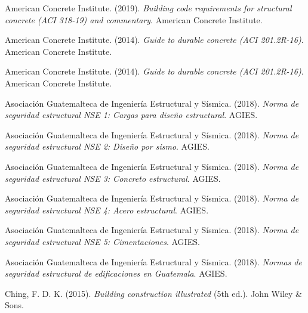 \documentclass[14pt,letterpaper]{extarticle}
\begin{document}
	
	\renewcommand{\refname}{Referencias}
	
		 American Concrete Institute. (2019). \textit{Building code requirements for structural concrete (ACI 318-19) and commentary}. American Concrete Institute.
		
	
		 American Concrete Institute. (2014). \textit{Guide to durable concrete (ACI 201.2R-16)}. American Concrete Institute.
	

		
	
		
		American Concrete Institute. (2014). \textit{Guide to durable concrete (ACI 201.2R-16)}. American Concrete Institute.
		
		Asociación Guatemalteca de Ingeniería Estructural y Sísmica. (2018). \textit{Norma de seguridad estructural NSE 1: Cargas para diseño estructural}. AGIES.
		
		 Asociación Guatemalteca de Ingeniería Estructural y Sísmica. (2018). \textit{Norma de seguridad estructural NSE 2: Diseño por sismo}. AGIES.
		
		 Asociación Guatemalteca de Ingeniería Estructural y Sísmica. (2018). \textit{Norma de seguridad estructural NSE 3: Concreto estructural}. AGIES.
		
		 Asociación Guatemalteca de Ingeniería Estructural y Sísmica. (2018). \textit{Norma de seguridad estructural NSE 4: Acero estructural}. AGIES.
		
		 Asociación Guatemalteca de Ingeniería Estructural y Sísmica. (2018). \textit{Norma de seguridad estructural NSE 5: Cimentaciones}. AGIES.
		
		 Asociación Guatemalteca de Ingeniería Estructural y Sísmica. (2018). \textit{Normas de seguridad estructural de edificaciones en Guatemala}. AGIES.
		
		Ching, F. D. K. (2015). \textit{Building construction illustrated} (5th ed.). John Wiley \& Sons.
		
	
	
	
\end{document}
